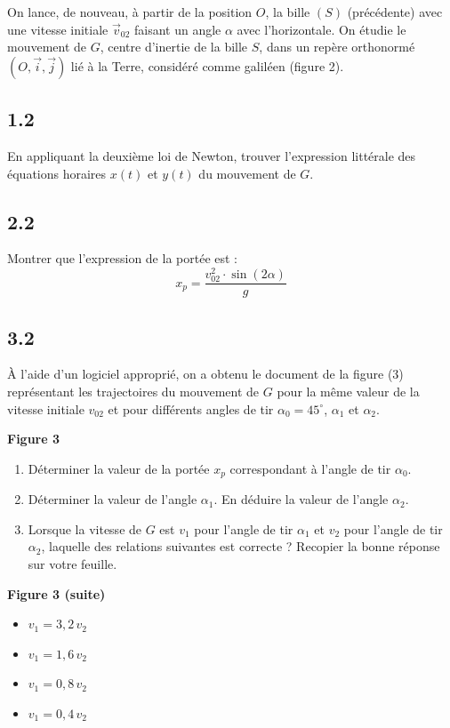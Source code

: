 On lance, de nouveau, à partir de la position $O$, la bille $(S)$ (précédente)
avec une vitesse initiale $\vec{v}_{02}$ faisant un angle $\alpha$ avec
l'horizontale. On étudie le mouvement de $G$, centre d'inertie de la bille $S$,
dans un repère orthonormé $(O,\vec{i},\vec{j})$ lié à la Terre, considéré
comme galiléen (figure 2).

\subsection*{1.2}
En appliquant la deuxième loi de Newton, trouver l'expression littérale des équations horaires $x(t)$ et $y(t)$ du mouvement de $G$.

\subsection*{2.2}
Montrer que l'expression de la portée est :
\[
x_p = \frac{v_{02}^2 \cdot \sin(2\alpha)}{g}
\]

\subsection*{3.2}
À l'aide d'un logiciel approprié, on a obtenu le document de la figure (3) représentant les trajectoires du mouvement de $G$ pour la même valeur de la vitesse initiale $v_{02}$ et pour différents angles de tir $\alpha_0 = 45^\circ$, $\alpha_1$ et $\alpha_2$.

\begin{center}
\textbf{Figure 3}
\end{center}

\begin{enumerate}
    \item[\textbf{a.}] Déterminer la valeur de la portée $x_p$ correspondant à l'angle de tir $\alpha_0$.
    \item[\textbf{b.}] Déterminer la valeur de l'angle $\alpha_1$. En déduire la valeur de l'angle $\alpha_2$.
    \item[\textbf{c.}] Lorsque la vitesse de $G$ est $v_1$ pour l'angle de tir $\alpha_1$ et $v_2$ pour l'angle de tir $\alpha_2$, laquelle des relations suivantes est correcte ? Recopier la bonne réponse sur votre feuille.
\end{enumerate}

\begin{center}
\textbf{Figure 3 (suite)}
\end{center}

\begin{itemize}
    \item[\textbf{a.}] $v_1 = 3,2 \, v_2$
    \item[\textbf{b.}] $v_1 = 1,6 \, v_2$
    \item[\textbf{c.}] $v_1 = 0,8 \, v_2$
    \item[\textbf{d.}] $v_1 = 0,4 \, v_2$
\end{itemize}

